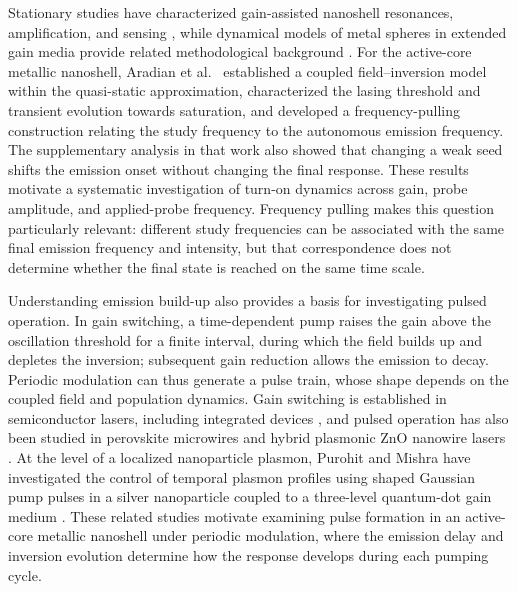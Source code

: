 \documentclass{optica-article}
\begin{document}
\begin{revision}
Stationary studies have characterized gain-assisted nanoshell resonances, amplification, and sensing \cite{Caicedo:2022,ShiliangQu:2015-2,ShiliangQu:2015}, while dynamical models of metal spheres in extended gain media provide related methodological background \cite{Veltri:2016,Recalde:2023}. For the active-core metallic nanoshell, Aradian et al.~\cite{Aradian:2024} established a coupled field--inversion model within the quasi-static approximation, characterized the lasing threshold and transient evolution towards saturation, and developed a frequency-pulling construction relating the study frequency to the autonomous emission frequency. The supplementary analysis in that work also showed that changing a weak seed shifts the emission onset without changing the final response. These results motivate a systematic investigation of turn-on dynamics across gain, probe amplitude, and applied-probe frequency. Frequency pulling makes this question particularly relevant: different study frequencies can be associated with the same final emission frequency and intensity, but that correspondence does not determine whether the final state is reached on the same time scale.

Understanding emission build-up also provides a basis for investigating pulsed operation. In gain switching, a time-dependent pump raises the gain above the oscillation threshold for a finite interval, during which the field builds up and depletes the inversion; subsequent gain reduction allows the emission to decay. Periodic modulation can thus generate a pulse train, whose shape depends on the coupled field and population dynamics. Gain switching is established in semiconductor lasers, including integrated devices \cite{Hammad:2021}, and pulsed operation has also been studied in perovskite microwires and hybrid plasmonic ZnO nanowire lasers \cite{Tian:2022,Sidiropoulos:2014}. At the level of a localized nanoparticle plasmon, Purohit and Mishra have investigated the control of temporal plasmon profiles using shaped Gaussian pump pulses in a silver nanoparticle coupled to a three-level quantum-dot gain medium \cite{Purohit:2024PumpPulse}. These related studies motivate examining pulse formation in an active-core metallic nanoshell under periodic modulation, where the emission delay and inversion evolution determine how the response develops during each pumping cycle.


\end{revision}
\end{document}
